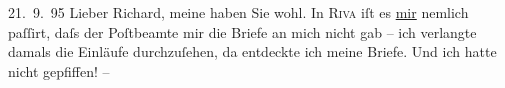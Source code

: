 \pstart
           \raggedleft{}{\pb}21. 9. 95\pend
           \vspace{0.5em}
\pstart
           Lieber Richard, meine \label{K_L00489-1v}\label{K_L00489-1} haben Sie wohl. In \textsc{Riva} iſt es \uline{mir} nemlich \label{K_L00489-2v}\label{K_L00489-2} paſſirt, daſs der
               Poſtbeamte mir die Briefe an mich nicht gab – ich verlangte damals die Einläufe
               durchzuſehen, da entdeckte ich meine Briefe. Und ich hatte nicht gepfiffen! –\pend
           
